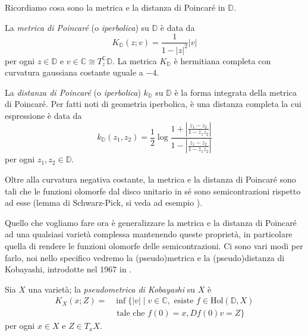 Ricordiamo cosa sono la metrica e la distanza di Poincaré in $\mathbb{D}$.

\begin{defn}
    La \textit{metrica di Poincaré} (o \textit{iperbolica}) su $\mathbb{D}$ è data da
    \begin{equation}
        K_{\mathbb{D}}(z;v)=\frac{1}{1-|z|^2}|v|
    \end{equation}
    per ogni $z \in \mathbb{D}$ e $v \in \mathbb{C}\cong T_z^{\mathbb{C}}\mathbb{D}$. La metrica $K_{\mathbb{D}}$ è hermitiana completa con curvatura gaussiana costante uguale a $-4$.
\end{defn}

\begin{defn}
    La \textit{distanza di Poincaré} (o \textit{iperbolica}) $k_{\mathbb{D}}$ su $\mathbb{D}$ è la forma integrata della metrica di Poincaré. Per fatti noti di geometria iperbolica, è una distanza completa la cui espressione è data da
    \begin{equation}
        k_{\mathbb{D}}(z_1,z_2)=\frac{1}{2}\log{\frac{1+\left|\frac{z_1-z_2}{1-\bar{z}_1z_2}\right|}{1-\left|\frac{z_1-z_2}{1-\bar{z}_1z_2}\right|}}
    \end{equation}
    per ogni $z_1,z_2 \in \mathbb{D}$.
\end{defn}

Oltre alla curvatura negativa costante, la metrica e la distanza di Poincaré sono tali che le funzioni olomorfe dal disco unitario in sé sono semicontrazioni rispetto ad esse (lemma di Schwarz-Pick, si veda ad esempio \cite[Chapter I, paragraph 1, Theorem 1.1]{K1}).

Quello che vogliamo fare ora è generalizzare la metrica e la distanza di Poincaré ad una qualsiasi varietà complessa mantenendo queste proprietà, in particolare quella di rendere le funzioni olomorfe delle semicontrazioni. Ci sono vari modi per farlo, noi nello specifico vedremo la (pseudo)metrica e la (pseudo)distanza di Kobayashi, introdotte nel 1967 in \cite{K2}.

\begin{defn}
    Sia $X$ una varietà; la \textit{pseudometrica di Kobayashi} su $X$ è
    \begin{equation}\begin{split}
        K_X(x;Z)=&\inf\{|v| \mid v \in \mathbb{C}, \text{ esiste }f \in \text{Hol}(\mathbb{D},X) \\
        &\text{ tale che } f(0)=x, Df(0)v=Z\}
    \end{split}\end{equation}
    per ogni $x \in X$ e $Z \in T_xX$.
\end{defn}

